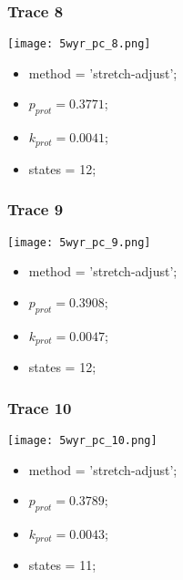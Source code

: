 \subsubsection{Trace 8}
\begin{minipage}[c]{0.7\textwidth}
    \texttt{[image: 5wyr\_pc\_8.png]}
\end{minipage}
\hfill
\begin{minipage}[c]{0.45\textwidth}
    \begin{itemize}
        \item method = 'stretch-adjust';
        \item $p_{prot}=0.3771$;
        \item $k_{prot}=0.0041$;
        \item states = 12;
    \end{itemize}
\end{minipage}

\subsubsection{Trace 9}
\begin{minipage}[c]{0.7\textwidth}
    \texttt{[image: 5wyr\_pc\_9.png]}
\end{minipage}
\hfill
\begin{minipage}[c]{0.45\textwidth}
    \begin{itemize}
        \item method = 'stretch-adjust';
        \item $p_{prot}=0.3908$;
        \item $k_{prot}=0.0047$;
        \item states = 12;
    \end{itemize}
\end{minipage}

\subsubsection{Trace 10}
\begin{minipage}[c]{0.7\textwidth}
    \texttt{[image: 5wyr\_pc\_10.png]}
\end{minipage}
\hfill
\begin{minipage}[c]{0.45\textwidth}
    \begin{itemize}
        \item method = 'stretch-adjust';
        \item $p_{prot}=0.3789$;
        \item $k_{prot}=0.0043$;
        \item states = 11;
    \end{itemize}
\end{minipage}

